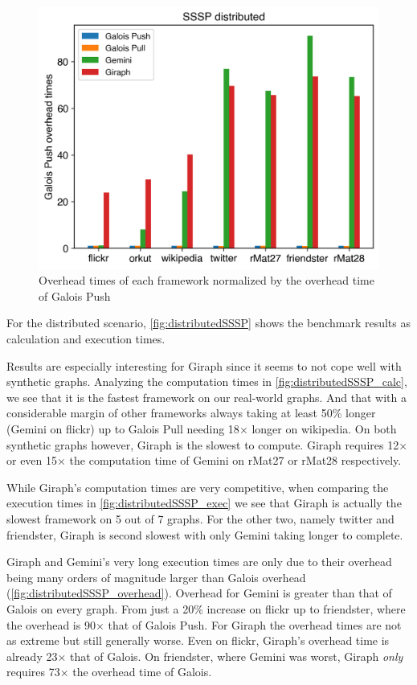 \begin{figure}
	\includegraphics[width=\linewidth]{../../plots/distributedSSSP_overheadTimeNormalizedToGalois.png}
	\caption{Overhead times of each framework normalized by the overhead time of Galois Push}
	\label{fig:distributedSSSP_overhead}
\end{figure}

For the distributed scenario, \autoref{fig:distributedSSSP} shows the benchmark results as calculation and execution times. 

Results are especially interesting for Giraph since it seems to not cope well with synthetic graphs. Analyzing the computation times in \autoref{fig:distributedSSSP_calc}, we see that it is the fastest framework on our real-world graphs. And that with a considerable margin of other frameworks always taking at least 50\% longer (Gemini on flickr) up to Galois Pull needing 18$\times$ longer on wikipedia.  
On both synthetic graphs however, Giraph is the slowest to compute. Giraph requires 12$\times$ or even 15$\times$ the computation time of Gemini on rMat27 or rMat28 respectively.

While Giraph's computation times are very competitive, when comparing the execution times in \autoref{fig:distributedSSSP_exec} we see that Giraph is actually the slowest framework on 5 out of 7 graphs. For the other two, namely twitter and friendster, Giraph is second slowest with only Gemini taking longer to complete.

Giraph and Gemini's very long execution times are only due to their overhead being many orders of magnitude larger than Galois overhead (\autoref{fig:distributedSSSP_overhead}).
Overhead for Gemini is greater than that of Galois on every graph. From just a 20\% increase on flickr up to friendster, where the overhead is 90$\times$ that of Galois Push.
For Giraph the overhead times are not as extreme but still generally worse. Even on flickr, Giraph's overhead time is already 23$\times$ that of Galois. On friendster, where Gemini was worst, Giraph \emph{only} requires 73$\times$ the overhead time of Galois.






